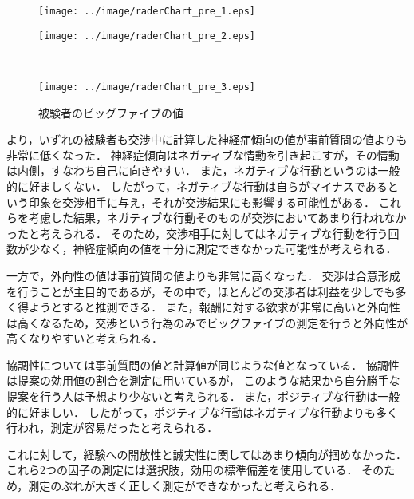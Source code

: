 \begin{figure}[bt]
    \begin{minipage}[b]{0.47\linewidth}
        \centering
        \texttt{[image: ../image/raderChart\_pre\_1.eps]}
        \label{fig:pre_big5_sub1}
    \end{minipage}
    \begin{minipage}[b]{0.47\linewidth}
        \centering
        \texttt{[image: ../image/raderChart\_pre\_2.eps]}
        \label{fig:pre_big5_sub2}
    \end{minipage}\\
    \begin{center}
        \begin{minipage}[b]{0.47\linewidth}
            \centering
            \texttt{[image: ../image/raderChart\_pre\_3.eps]}
            \label{fig:pre_big5_sub3}
        \end{minipage}
    \end{center}
    \caption{被験者のビッグファイブの値}\label{fig:pre_big5}
\end{figure}

より，いずれの被験者も交渉中に計算した神経症傾向の値が事前質問の値よりも非常に低くなった．
神経症傾向はネガティブな情動を引き起こすが，その情動は内側，すなわち自己に向きやすい．
また，ネガティブな行動というのは一般的に好ましくない．
したがって，ネガティブな行動は自らがマイナスであるという印象を交渉相手に与え，それが交渉結果にも影響する可能性がある．
これらを考慮した結果，ネガティブな行動そのものが交渉においてあまり行われなかったと考えられる．
そのため，交渉相手に対してはネガティブな行動を行う回数が少なく，神経症傾向の値を十分に測定できなかった可能性が考えられる．

一方で，外向性の値は事前質問の値よりも非常に高くなった．
交渉は合意形成を行うことが主目的であるが，その中で，ほとんどの交渉者は利益を少しでも多く得ようとすると推測できる．
また，報酬に対する欲求が非常に高いと外向性は高くなるため，交渉という行為のみでビッグファイブの測定を行うと外向性が高くなりやすいと考えられる．

協調性については事前質問の値と計算値が同じような値となっている．
協調性は提案の効用値の割合を測定に用いているが，
このような結果から自分勝手な提案を行う人は予想より少ないと考えられる．
また，ポジティブな行動は一般的に好ましい．
したがって，ポジティブな行動はネガティブな行動よりも多く行われ，測定が容易だったと考えられる．

これに対して，経験への開放性と誠実性に関してはあまり傾向が掴めなかった．
これら2つの因子の測定には選択肢，効用の標準偏差を使用している．
そのため，測定のぶれが大きく正しく測定ができなかったと考えられる．

